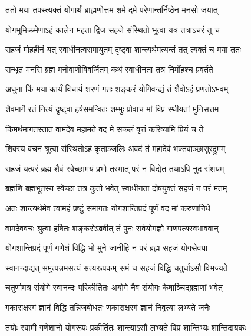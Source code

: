 \twolineshloka
{ततो मया तपस्त्यक्तं योगार्थं ब्राह्मणोत्तम}
{शमे दमे परेणान्तर्निष्ठेन मनसो जयात्} %

\twolineshloka
{योगभूमिक्रमेणाऽहं कालेन महता द्विज}
{सहजे संस्थितो भूत्वा यत्र तत्राऽचरं तु च} %

\twolineshloka
{सहजं मोहहीनं यत् स्वाधीनत्वसमायुतम्}
{दृष्ट्वा शान्त्यर्थमत्यन्तं तत् त्यक्तं च मया ततः} %

\twolineshloka
{सन्धृतं मनसि ब्रह्म मनोवाणीविवर्जितम्}
{कथं स्वाधीनता तत्र निर्मोहश्च प्रवर्तते} %

\twolineshloka
{अधुना किं मया कार्यं विचार्य शरणं गतः}
{शङ्करं योगिवन्द्यं तं शैवोऽहं प्रणतोऽभवम्} %

\twolineshloka
{शैवमार्गे रतं नित्यं दृष्ट्वा हर्षसमन्वितः}
{शम्भुः प्रोवाच मां विप्र स्थीयतां मुनिसत्तम} %

\twolineshloka
{किमर्थमागतस्तात वामदेव महामते}
{वद मे सकलं वृत्तं करिष्यामि प्रियं च ते} %

\twolineshloka
{शिवस्य वचनं श्रुत्वा संस्थितोऽहं कृताञ्जलिः}
{अवदं तं महादेवं भक्तवाञ्छासुरद्रुमम्} %

\twolineshloka
{सहजं यत्परं ब्रह्म शैवं स्वेच्छामयं प्रभो}
{तस्मात् परं न विद्येत तथाऽपि नुद संशयम्} %

\twolineshloka
{ब्रह्मणि ब्रह्मभूतस्य स्वेच्छा तत्र कुतो भवेत्}
{स्वाधीनता दोषयुक्तं सहजं न परं मतम्} %

\twolineshloka
{अतः शान्त्यर्थमेव त्वामहं प्रष्टुं समागतः}
{योगशान्तिप्रदं पूर्णं वद मां करुणानिधे} %


\twolineshloka
{वामदेववचः श्रुत्वा हर्षितः शङ्करोऽब्रवीत्}
{तं पुनः सर्वयोगज्ञो गाणपत्यस्वभाववान्} %


\twolineshloka
{योगशान्तिप्रदं पूर्णं गणेशं विद्धि भो मुने}
{जानीहि न परं ब्रह्म सहजं योगसेवया} %

\twolineshloka
{स्वानन्दाद्यत् समुत्पन्नमसत्यं सत्यरूपकम्}
{समं च सहजं विद्धि चतुर्धाऽसौ विभज्यते} %

\twolineshloka
{चतुर्णामत्र संयोगे स्वानन्दः परिकीर्तितः}
{अयोगे नैव संयोगः केषाञ्चिद्ब्रह्मणां भवेत्} %

\twolineshloka
{गकाराक्षरगं ज्ञानं विद्धि तन्निजबोधतः}
{णकाराक्षरगं ज्ञानं निवृत्या लभ्यते जनैः} %

\twolineshloka
{तयोः स्वामी गणेशानो योगरूपः प्रकीर्तितः}
{शान्त्याऽसौ लभ्यते विप्र शान्तिभ्यः शान्तिदायकः} %

